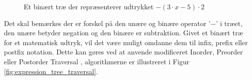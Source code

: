\begin{figure}[H]
\centering
{}
\caption{Et binært træ der repræsenterer udtrykket $-(3 \cdot x - 5) \cdot 2$}
\label{fig:expression_tree}
\end{figure}
Det skal bemærkes der er forskel på den unære og binære operator '$-$' i træet, den unære betyder negation og den binære er subtraktion. Givet et binært træ for et matematisk udtryk, vil det være muligt omdanne dem til infix, prefix eller postfix notation. Dette kan gøres ved at anvende modificeret Inorder, Preorder eller Postorder Traversal , algorithmerne er illustreret i Figur \ref{fig:expression_tree_traversal}.


